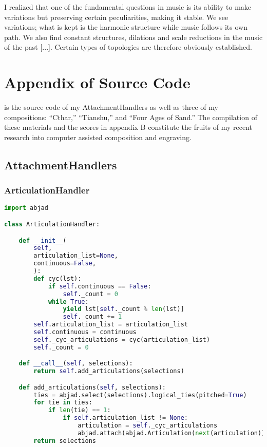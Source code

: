 \singlespace
\begin{savequote}[75mm] 
I realized that one of the fundamental questions in music is its ability to make variations but preserving certain peculiarities, making it stable. We see variations; what is kept is the harmonic structure while music follows its own path. We also find constant structures, dilations and scale reductions in the music of the past [...]. Certain types of topologies are therefore obviously established. \\
\citeyearpar[Metamodels in Compositional Practices p.85]{Besada}
\end{savequote}

\appendix
\chapter{Appendix of Source Code}

\pagestyle{fancy}
\renewcommand\headrulewidth{0pt}
\lhead{}\chead{}\rhead{}
\cfoot{\vspace*{1.5\baselineskip}\thepage}

 is the source code of my AttachmentHandlers as well as three of my compositions: ``Cthar,'' ``Tianshu,'' and ``Four Ages of Sand.'' The compilation of these materials and the scores in appendix B constitute the fruits of my recent research into computer assisted composition and engraving.

\section{AttachmentHandlers}
\subsection{ArticulationHandler}
\singlespace
\begin{lstlisting}[language=Python, caption=ArticulationHandler]
import abjad

class ArticulationHandler:

    def __init__(
        self,
        articulation_list=None,
        continuous=False,
        ):
        def cyc(lst):
            if self.continuous == False:
                self._count = 0
            while True:
                yield lst[self._count % len(lst)]
                self._count += 1
        self.articulation_list = articulation_list
        self.continuous = continuous
        self._cyc_articulations = cyc(articulation_list)
        self._count = 0

    def __call__(self, selections):
        return self.add_articulations(selections)

    def add_articulations(self, selections):
        ties = abjad.select(selections).logical_ties(pitched=True)
        for tie in ties:
            if len(tie) == 1:
                if self.articulation_list != None:
                    articulation = self._cyc_articulations
                    abjad.attach(abjad.Articulation(next(articulation)), tie[0])
        return selections
\end{lstlisting}
\doublespace

